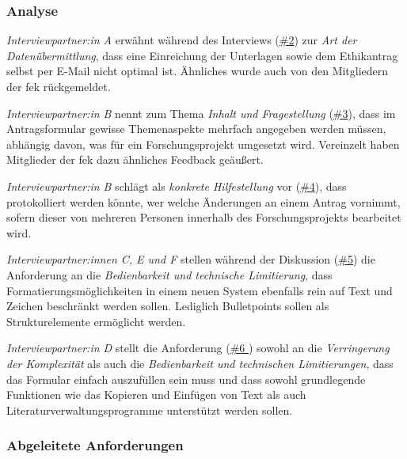 \documentclass[a4paper,12pt,twoside,numbers=noendperiod]{scrreprt}
\begin{document}
\subsubsection*{Analyse}
\label{sub-sub-sec:analyse-während-erstellung-einreichung}

\textit{Interviewpartner:in A} erwähnt während des Interviews (\hyperref[tab:anforderungen-während-erstellung-einreichung]{\#2}) zur \textit{Art der Datenübermittlung}, dass eine Einreichung der Unterlagen sowie dem Ethikantrag selbst per E-Mail nicht optimal ist. Ähnliches wurde auch von den Mitgliedern der \ac{fek} rückgemeldet.

\medskip

\textit{Interviewpartner:in B} nennt zum Thema \textit{Inhalt und Fragestellung} (\hyperref[tab:anforderungen-während-erstellung-einreichung]{\#3}), dass im Antragsformular gewisse Themenaspekte mehrfach angegeben werden müssen, abhängig davon, was für ein Forschungsprojekt umgesetzt wird. Vereinzelt haben Mitglieder der \ac{fek} dazu ähnliches Feedback geäußert.

\medskip

\textit{Interviewpartner:in B} schlägt als \textit{konkrete Hilfestellung} vor (\hyperref[tab:anforderungen-während-erstellung-einreichung]{\#4}), dass protokolliert werden könnte, wer welche Änderungen an einem Antrag vornimmt, sofern dieser von mehreren Personen innerhalb des Forschungsprojekts bearbeitet wird.

\medskip

\textit{Interviewpartner:innen C, E und F} stellen während der Diskussion (\hyperref[tab:anforderungen-während-erstellung-einreichung]{\#5}) die Anforderung an die \textit{Bedienbarkeit und technische Limitierung}, dass Formatierungsmöglichkeiten in einem neuen System ebenfalls rein auf Text und Zeichen beschränkt werden sollen. Lediglich Bulletpoints sollen als Strukturelemente ermöglicht werden.

\medskip

\textit{Interviewpartner:in D} stellt die Anforderung (\hyperref[tab:anforderungen-während-erstellung-einreichung]{\#6 }) sowohl an die \textit{Verringerung der Komplexität} als auch die \textit{Bedienbarkeit und technischen Limitierungen}, dass das Formular einfach auszufüllen sein muss und dass sowohl grundlegende Funktionen wie das Kopieren und Einfügen von Text als auch Literaturverwaltungsprogramme unterstützt werden sollen.

\subsubsection*{Abgeleitete Anforderungen}
\label{sub-sub-sec:abgeleitete-anforderungen-während-erstellung-einreichung}
\end{document}
